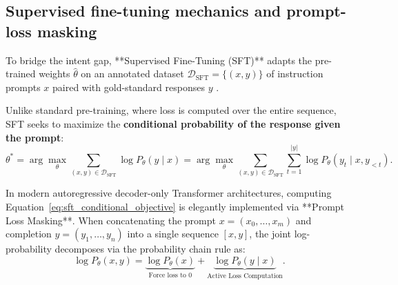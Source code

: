 \documentclass[../../../main.tex]{subfiles}
\begin{document}
\subsection{Supervised fine-tuning mechanics and prompt-loss masking}
\label{subsec:sft_mechanics_loss_masking}

To bridge the intent gap, **Supervised Fine-Tuning (SFT)** adapts the pre-trained weights $\hat{\theta}$ on an annotated dataset $\mathcal{D}_{\text{SFT}} = \{(x, y)\}$ of instruction prompts $x$ paired with gold-standard responses $y$ \citep{xiao2025}. 

Unlike standard pre-training, where loss is computed over the entire sequence, SFT seeks to maximize the \textbf{conditional probability of the response given the prompt}:
\begin{equation}
\label{eq:sft_conditional_objective}
\theta^* = \arg\max_\theta \sum_{(x, y) \in \mathcal{D}_{\text{SFT}}} \log P_\theta(y \mid x) = \arg\max_\theta \sum_{(x, y) \in \mathcal{D}_{\text{SFT}}} \sum_{t=1}^{|y|} \log P_\theta(y_t \mid x, y_{<t}).
\end{equation}

In modern autoregressive decoder-only Transformer architectures, computing Equation~\eqref{eq:sft_conditional_objective} is elegantly implemented via **Prompt Loss Masking**. When concatenating the prompt $x = (x_0, \dots, x_m)$ and completion $y = (y_1, \dots, y_n)$ into a single sequence $[x, y]$, the joint log-probability decomposes via the probability chain rule as:
\begin{equation}
\log P_\theta(x, y) = \underbrace{\log P_\theta(x)}_{\text{Force loss to } 0} + \underbrace{\log P_\theta(y \mid x)}_{\text{Active Loss Computation}}.
\end{equation}
\end{document}
